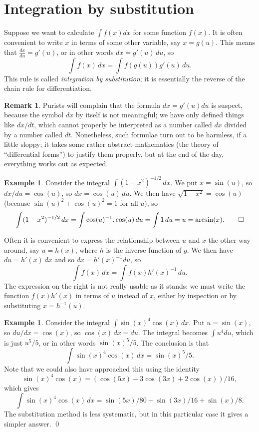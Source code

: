 \documentclass[a4paper]{book}
\newcommand{\PURPLE}[1]{{\color{purple}#1}}
\renewcommand{\:}{\colon}
\newcommand{\DEFN}[1]{\PURPLE{\emph{#1}}}
\theoremstyle{definition}
\newtheorem{remark}[theorem]{Remark}
\newtheorem{example}[theorem]{Example}
\begin{document}
\section{Integration by substitution}
\label{sec-int-subs}

Suppose we want to calculate $\int f(x)dx$ for some function $f(x)$.
It is often convenient to write $x$ in terms of some other variable,
say $x=g(u)$.  This means that $\frac{dx}{du}=g'(u)$, or in other
words $dx=g'(u)\,du$, so
\[ \int f(x)\, dx = \int f(g(u)) g'(u)\, du. \]
This rule is called \DEFN{integration by substitution}; it is
essentially the reverse of the chain rule for differentiation.
\begin{remark}
 Purists will complain that the formula $dx=g'(u)du$ is suspect,
 because the symbol $dx$ by itself is not meaningful; we have only
 defined things like $dx/dt$, which cannot properly be interpreted as
 a number called $dx$ divided by a number called $dt$.  Nonetheless,
 such formulae turn out to be harmless, if a little sloppy; it takes
 some rather abstract mathematics (the theory of ``differential
 forms'') to justify them properly, but at the end of the day,
 everything works out as expected.
\end{remark}
\begin{example}
 Consider the integral $\int(1-x^2)^{-1/2}\,dx$.  We put $x=\sin(u)$,
 so $dx/du=\cos(u)$, so $dx=\cos(u)\,du$.  We then have
 $\sqrt{1-x^2}=\cos(u)$ (because $\sin(u)^2+\cos(u)^2=1$ for all $u$),
 so
 \[ \int (1-x^2)^{-1/2}\,dx = \int \cos(u)^{-1}.\cos(u)\,du
     = \int 1\,du = u = \arcsin(x). \qed
 \]
\end{example}

Often it is convenient to express the relationship between $u$ and $x$
the other way around, say $u=h(x)$, where $h$ is the inverse function
of $g$.  We then have $du=h'(x)\,dx$ and so $dx=h'(x)^{-1}du$, so 
\[ \int f(x)\, dx = \int f(x) h'(x)^{-1} \, du. \]
The expression on the right is not really usable as it stands: we must
write the function $f(x)h'(x)$ in terms of $u$ instead of $x$, either
by inspection or by substituting $x=h^{-1}(u)$.
\begin{example}
 Consider the integral $\int\sin(x)^4\cos(x)\,dx$.  Put $u=\sin(x)$,
 so $du/dx=\cos(x)$, so $\cos(x)\,dx=du$.  The integral becomes
 $\int u^4 du$, which is just $u^5/5$, or in other words
 $\sin(x)^5/5$.  The conclusion is that
 \[ \int \sin(x)^4\cos(x)\,dx = \sin(x)^5/5. \]
 Note that we could also have approached this using the identity
 \[ \sin(x)^4\cos(x) = (\cos(5x) - 3\cos(3x) + 2\cos(x))/16, \]
 which gives
 \[ \int\sin(x)^4\cos(x)\,dx =
     \sin(5x)/80 - \sin(3x)/16 + \sin(x)/8.
 \]
 The substitution method is less systematic, but in this particular
 case it gives a simpler answer. \qed
\end{example}
\end{document}
